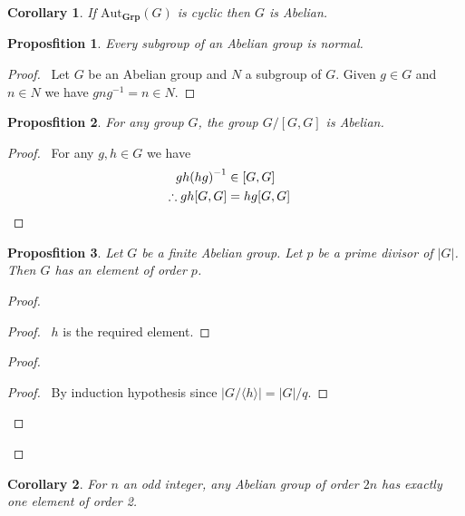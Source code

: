 \documentclass{book}
\let\qed\relax
\newtheorem{prop}{Proposfition}[chapter]
\newtheorem{cor}{Corollary}[prop]
\theoremstyle{definition}
\newcommand{\Aut}[2]{\ensuremath{\mathrm{Aut}_{#1} \left( {#2} \right)}}
\newcommand{\Grp}{\ensuremath{\mathbf{Grp}}}
\newcommand{\inv}[1]{\ensuremath{{#1}^{-1}}}
\begin{document}
\begin{cor}
If $\Aut{\Grp}{G}$ is cyclic then $G$ is Abelian.
\end{cor}

\begin{prop}
Every subgroup of an Abelian group is normal.
\end{prop}

\begin{proof}
\pf\ Let $G$ be an Abelian group and $N$ a subgroup of $G$. Given $g \in G$ and $n \in N$ we have $gn\inv{g} = n \in N$. \qed
\end{proof}

\begin{prop}
For any group $G$, the group $G / [G,G]$ is Abelian.
\end{prop}

\begin{proof}
\pf\ For any $g,h \in G$ we have
\begin{align*}
gh\inv{(hg)} & \in [G,G] \\
\therefore gh[G,G] & = hg[G,G] & \qed
\end{align*}
\end{proof}

\begin{prop}
Let $G$ be a finite Abelian group. Let $p$ be a prime divisor of $|G|$. Then $G$ has an element of order $p$.
\end{prop}

\begin{proof}
\pf
{}
\begin{proof}
\pf\ $h$ is the required element.
\end{proof}
\begin{proof}
\begin{proof}
\pf\ By induction hypothesis since $|G / \langle h \rangle| = |G| / q$.
\end{proof}
\end{proof}
\qed
\end{proof}

\begin{cor}
For $n$ an odd integer, any Abelian group of order $2n$ has exactly one element of order 2.
\end{cor}
\end{document}

